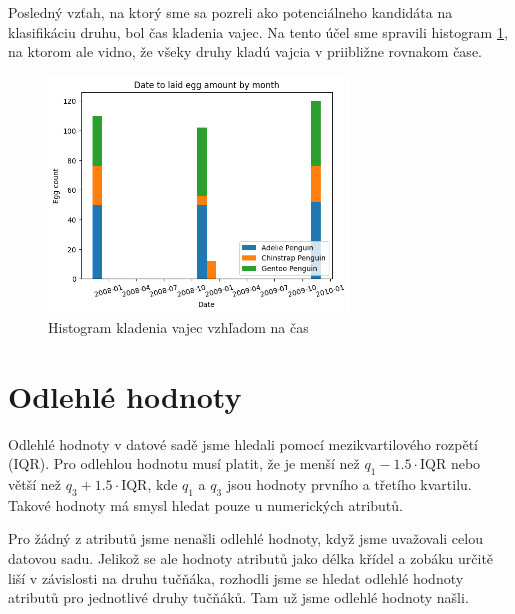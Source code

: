 \documentclass[10pt,xcolor=pdflatex,dvipsnames,table,oneside]{book}
\begin{document}
Posledný vzťah, na ktorý sme sa pozreli ako potenciálneho kandidáta na klasifikáciu druhu, bol čas kladenia vajec. Na tento účel sme spravili histogram \ref{fig:egg}, na ktorom ale vidno, že všeky druhy kladú vajcia v priibližne rovnakom čase.
\begin{figure}[h]
  \centering
  \includegraphics[width=8cm]{img/date_egg.png}
  \caption{Histogram kladenia vajec vzhľadom na čas}
  \label{fig:egg}
\end{figure}


\FloatBarrier
\section{Odlehlé hodnoty}
Odlehlé hodnoty v datové sadě jsme hledali pomocí mezikvartilového rozpětí (IQR). Pro odlehlou hodnotu musí platit, že je menší než $q_1 - 1.5 \cdot \textrm{IQR}$ nebo větší než $q_3 + 1.5 \cdot \textrm{IQR}$, kde $q_1$ a $q_3$ jsou hodnoty prvního a třetího kvartilu. Takové hodnoty má smysl hledat pouze u numerických atributů.

Pro žádný z atributů jsme nenašli odlehlé hodnoty, když jsme uvažovali celou datovou sadu. Jelikož se ale hodnoty atributů jako délka křídel a zobáku určitě liší v závislosti na druhu tučňáka, rozhodli jsme se hledat odlehlé hodnoty atributů pro jednotlivé druhy tučňáků.
Tam už jsme odlehlé hodnoty našli.
\end{document}

